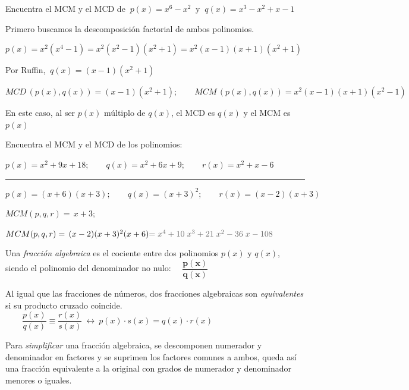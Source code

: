 \vspace{4mm}
\begin{miejemplo}

Encuentra el MCM y el MCD de $\ p(x)=x^6-x^2 \ $ y $ \ q(x)=x^3-x^2+x-1$

\vspace{4mm} Primero buscamos la descomposición factorial de ambos polinomios.

\vspace{2mm} $p(x)=x^2(x^4-1)=x^2(x^2-1)(x^2+1)=x^2(x-1)(x+1)(x^2+1)$

\vspace{2mm} Por Ruffin, $\ q(x)=(x-1)(x^2+1)$

\vspace{2mm} $MCD \, \left( p(x),q(x) \right)= (x-1)(x^2+1);\qquad 
MCM \, \left( p(x),q(x) \right)=x^2(x-1)(x+1)(x^2-1)$

\vspace{2mm} \textcolor{gris}{En este caso, al ser $p(x)$ múltiplo de $q(x)$, el MCD es $q(x)$ y el MCM es $p(x)$}
	
\end{miejemplo}

\begin{miejercicio}

Encuentra el MCM y el MCD de los polinomios:

$p(x)=x^2+9x+18;\qquad q(x)=x^2+6x+9;\qquad r(x)=x^2+x-6$

\rule{250pt}{0.1pt}

$p(x)=(x+6)(x+3);\qquad q(x)=(x+3)^2;\qquad r(x)=(x-2)(x+3)$	
 
\vspace{2mm} $MCM(p,q,r)=\, x+3;\qquad $

$MCM(p,q,r)=\, (x-2)(x+3)^2(x+6) \textcolor{gris}{ = x^{4} + 10 \; x^{3} + 21 \; x^{2} - 36 \; x - 108}$
\end{miejercicio}
\vspace{5mm}

\begin{definition}

Una \emph{fracción algebraica} es el cociente entre dos polinomios $p(x)$ y $q(x)$, siendo el polinomio del denominador no nulo: $\quad \boldsymbol{\dfrac{p(x)}{q(x)}}$

\vspace{4mm} Al igual que las fracciones de números, dos fracciones algebraicas son \emph{equivalentes} si su producto cruzado coincide.
$\qquad \dfrac{p(x)}{q(x)} \equiv  \dfrac{r(x)}{s(x)} \ \leftrightarrow \ p(x)\cdot s(x)=q(x)\cdot r(x)$

\vspace{4mm} Para \emph{simplificar} una fracción algebraica, se descomponen numerador y denominador en factores y se suprimen los factores comunes a ambos, queda así una fracción equivalente a la original con grados de numerador y denominador menores o iguales.
	
\end{definition}

